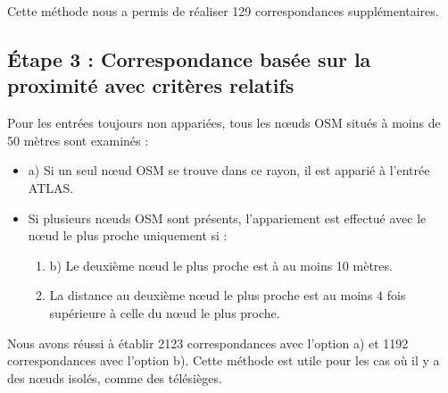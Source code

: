 Cette méthode nous a permis de réaliser 129 correspondances supplémentaires.

\subsection{Étape 3 : Correspondance basée sur la proximité avec critères relatifs}  
Pour les entrées toujours non appariées, tous les nœuds OSM situés à moins de 50 mètres sont examinés :  
\begin{itemize}  
    \item a) Si un seul nœud OSM se trouve dans ce rayon, il est apparié à l’entrée ATLAS.  
    \item Si plusieurs nœuds OSM sont présents, l’appariement est effectué avec le nœud le plus proche uniquement si :  
    \begin{enumerate}  
        \item b) Le deuxième nœud le plus proche est à au moins 10 mètres.  
        \item La distance au deuxième nœud le plus proche est au moins 4 fois supérieure à celle du nœud le plus proche.  
    \end{enumerate}  
\end{itemize}  
Nous avons réussi à établir 2123 correspondances avec l'option a) et 1192 correspondances avec l'option b).
Cette méthode est utile pour les cas où il y a des nœuds isolés, comme des télésièges.  

